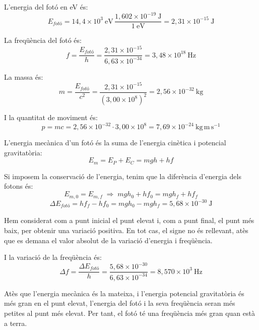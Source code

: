 \begin{solapartat}
 L'energia del fotó en eV és:
\[ E_\textit{fotó} = 14,4\times 10^{3}\ \mathrm{eV}\,\frac{1,602\times 10^{-19}\ \mathrm{J}}{1\ \mathrm{eV}} = 2,31\times 10^{-15}\ \mathrm{J} \]

 La freqüència del fotó és:
\[ f = \frac{E_\textit{fotó}}{h} = \frac{2,31\times 10^{-15}}{6,63\times 10^{-34}} = 3,48\times 10^{18}\ \mathrm{Hz} \]

 La massa és:
\[ m = \frac{E_\textit{fotó}}{c^2} = \frac{2,31\times 10^{-15}}{(3,00\times 10^{8})^2} = 2,56\times 10^{-32}\ \mathrm{kg} \]

 I la quantitat de moviment és:
\[ p = mc = 2,56\times 10^{-32}\cdot 3,00\times 10^{8} = 7,69\times 10^{-24}\ \mathrm{kg\,m\,s^{-1}} \]
\end{solapartat}

\begin{solapartat}
 L'energia mecànica d'un fotó és la suma de l'energia cinètica i potencial gravitatòria:
\[ E_m = E_P + E_C = mgh + hf \]

 Si imposem la conservació de l'energia, tenim que la diferència d'energia dels fotons és:
\[ E_{m,0} = E_{m,f} \;\Rightarrow\; mgh_0 + hf_0 = mgh_f + hf_f \]
\[ \Delta E_\textit{fotó} = hf_f - hf_0 = mgh_0 - mgh_f = 5,68\times 10^{-30}\ \mathrm{J} \]

Hem considerat com a punt inicial el punt elevat i, com a punt final, el punt més baix, per obtenir una variació positiva. En tot cas, el signe no és rellevant, atès que es demana el valor absolut de la variació d'energia i freqüència.

 I la variació de la freqüència és:
\[ \Delta f = \frac{\Delta E_\textit{fotó}}{h} = \frac{5,68\times 10^{-30}}{6,63\times 10^{-34}} = 8,570\times 10^{3}\ \mathrm{Hz} \]

 Atès que l'energia mecànica és la mateixa, i l'energia potencial gravitatòria és més gran en el punt elevat, l'energia del fotó i la seva freqüència seran més petites al punt més elevat. Per tant, el fotó té una freqüència més gran quan està a terra.
\end{solapartat}
